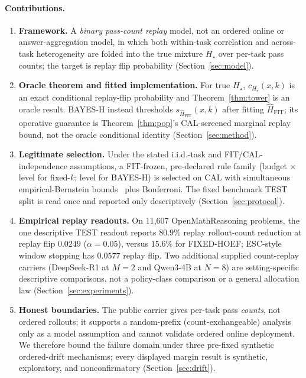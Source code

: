 \documentclass{article}
\theoremstyle{definition}
\theoremstyle{remark}
\newcommand{\trueH}{H_\star}
\newcommand{\oraclecert}{c_{\trueH}}
\newcommand{\fitscore}{s_{\widehat H_{\mathrm{FIT}}}}
\begin{document}
\paragraph{Contributions.}
\begin{enumerate}[leftmargin=1.6em,itemsep=1pt]
\item \textbf{Framework.} A \emph{binary pass-count replay} model, not an
ordered online or answer-aggregation model, in which both within-task
correlation and across-task heterogeneity are folded into the true mixture
$\trueH$ over per-task pass counts; the target is replay flip probability
(Section~\ref{sec:model}).
\item \textbf{Oracle theorem and fitted implementation.} For true $\trueH$,
$\oraclecert(x,k)$ is an exact conditional replay-flip probability and
Theorem~\ref{thm:tower} is an oracle result. BAYES-H instead thresholds
$\fitscore(x,k)$ after fitting $\widehat H_{\mathrm{FIT}}$; its operative
guarantee is Theorem~\ref{thm:pop}'s CAL-screened marginal replay bound, not
the oracle conditional identity (Section~\ref{sec:method}).
\item \textbf{Legitimate selection.} Under the stated i.i.d.-task and
FIT/CAL-independence assumptions, a FIT-frozen, pre-declared rule family
(budget $\times$ level for fixed-$k$; level for BAYES-H) is selected on CAL
with simultaneous empirical-Bernstein bounds~\citep{maurer2009eb} plus
Bonferroni.  The fixed benchmark TEST split is read once and reported only
descriptively (Section~\ref{sec:protocol}).
\item \textbf{Empirical replay readouts.} On 11{,}607 OpenMathReasoning
problems, the one descriptive TEST readout reports $80.9\%$ replay
rollout-count reduction at replay flip $0.0249$ ($\alpha=0.05$), versus
$15.6\%$ for FIXED-HOEF; ESC-style window stopping has $0.0577$ replay flip.
Two additional supplied count-replay carriers (DeepSeek-R1 at $M=2$ and
Qwen3-4B at $N=8$) are setting-specific descriptive comparisons, not a
policy-class comparison or a general allocation law (Section~\ref{sec:experiments}).
\item \textbf{Honest boundaries.} The public carrier gives per-task pass
\emph{counts}, not ordered rollouts; it supports a random-prefix
(count-exchangeable) analysis only as a model assumption and cannot validate
ordered online deployment. We therefore bound the failure domain under three
pre-fixed synthetic ordered-drift mechanisms; every displayed margin result is
synthetic, exploratory, and nonconfirmatory (Section~\ref{sec:drift}).
\end{enumerate}
\end{document}
